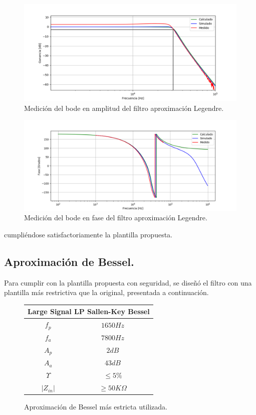 \begin{figure}[H]
\centering
	\centering
	\includegraphics[width=\textwidth]{Imagenes-Ej1/legendre_hs_med.png}
	\caption{Medición del bode en amplitud del filtro aproximación Legendre.}
	\label{leg_bodeamp_med}
\end{figure}
\begin{figure}[H]
\centering
	\centering
	\includegraphics[width=\textwidth]{Imagenes-Ej1/legendre_hspha_med.png}
	\caption{Medición del bode en fase del filtro aproximación Legendre.}
	\label{leg_bodepha_med}
\end{figure}

cumpliéndose satisfactoriamente la plantilla propuesta.

\subsection{Aproximación de Bessel.}

Para cumplir con la plantilla propuesta con seguridad, se diseñó el filtro con una plantilla más restrictiva que la original, presentada a continuación.
\begin{figure}[H]
		\begin{table}[H]
			\centering
			\begin{tabular}{@{}cc@{}}
			\toprule
			\multicolumn{2}{c}{Large Signal LP Sallen-Key Bessel} \\ \midrule
			$f_p$ & $1650Hz$ \\
			$f_a$ & $7800Hz$ \\
			$A_p$ & $2dB$ \\
			$A_a$ & $43dB$ \\
			$\Upsilon$ & $\leq 5\%$ \\
			$\left| Z_{in}\right|$ & $\geq 50K\Omega$ \\ \bottomrule
			\end{tabular}
		\end{table}
		\caption{Aproximación de Bessel más estricta utilizada.}
		\label{aprox_leg_est}
\end{figure}

